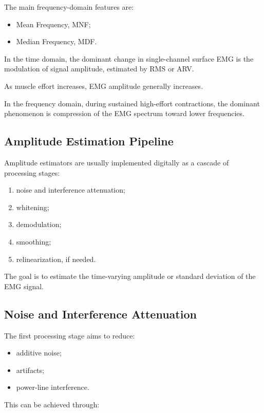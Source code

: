 The main frequency-domain features are:

\begin{itemize}[noitemsep]
    \item Mean Frequency, MNF;
    \item Median Frequency, MDF.
\end{itemize}

In the time domain, the dominant change in single-channel surface EMG is the modulation of signal amplitude, estimated by RMS or ARV.

As muscle effort increases, EMG amplitude generally increases.

In the frequency domain, during sustained high-effort contractions, the dominant phenomenon is compression of the EMG spectrum toward lower frequencies.

\subsection{Amplitude Estimation Pipeline}

Amplitude estimators are usually implemented digitally as a cascade of processing stages:

\begin{enumerate}[noitemsep]
    \item noise and interference attenuation;
    \item whitening;
    \item demodulation;
    \item smoothing;
    \item relinearization, if needed.
\end{enumerate}

The goal is to estimate the time-varying amplitude or standard deviation of the EMG signal.

\subsection{Noise and Interference Attenuation}

The first processing stage aims to reduce:

\begin{itemize}[noitemsep]
    \item additive noise;
    \item artifacts;
    \item power-line interference.
\end{itemize}

This can be achieved through:

